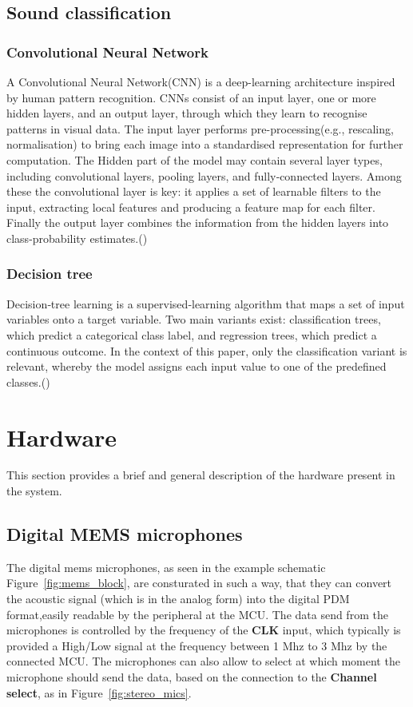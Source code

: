 \subsection{Sound classification}
\subsubsection{Convolutional Neural Network}
A Convolutional Neural Network(CNN) is a deep-learning architecture inspired by human pattern recognition. CNNs consist of an input layer, one or more hidden layers, and an output layer, through which they learn to recognise patterns in visual data. The input layer performs pre-processing(e.g., rescaling, normalisation) to bring each image into a standardised representation for further computation. The Hidden part of the model may contain several layer types, including convolutional layers, pooling layers, and fully‑connected layers. Among these the convolutional layer is key: it applies a set of learnable filters to the input, extracting local features and producing a feature map for each filter. Finally the output layer combines the information from the hidden layers into class-probability estimates.(\cite[Chapter 14]{geron2019handson})
\subsubsection{Decision tree}
Decision‑tree learning is a supervised‑learning algorithm that maps a set of input variables onto a target variable. Two main variants exist: classification trees, which predict a categorical class label, and regression trees, which predict a continuous outcome. In the context of this paper, only the classification variant is relevant, whereby the model assigns each input value to one of the predefined classes.(\cite[Chapter 6]{geron2019handson})
        
\section{Hardware}
    This section provides a brief and general description of the hardware present in the system. 
        \subsection{Digital MEMS microphones}
        The digital mems microphones, as seen in the example schematic Figure~\ref{fig:mems_block}, are consturated in such a way, that they can convert the acoustic signal (which is in the analog form) into the digital PDM format,easily readable by the peripheral at the MCU.
        The data send from the microphones is controlled by the frequency of the \textbf{CLK} input, which typically is provided a High/Low signal at the frequency between 1 Mhz to 3 Mhz by the connected MCU. 
        The microphones can also allow to select at which moment the microphone should send the data, based on the connection to the \textbf{Channel select}, as in Figure~\ref{fig:stereo_mics}.

